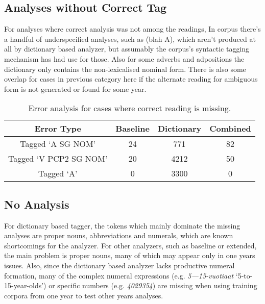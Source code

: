 \documentclass[postprint]{flammie}
\begin{document}
\subsection{Analyses without Correct Tag}

For analyses where correct analysis was not among the readings, 
In corpus there’s a handful of underspecified analyses, such as (blah A),
which aren’t produced at all by dictionary based analyzer, but assumably the
corpus’s syntactic tagging mechanism has had use for those. Also for some
adverbs and adpositions the dictionary only contains the non-lexicalised
nominal form. There is also some overlap for cases in previous category here
if the alternate reading for ambiguous form is not generated or found for some
year.

\begin{table}[h!]
  \centering
  \caption{Error analysis for cases where correct reading is missing.
  }\label{tab:incorrect1}
  \begin{scriptsize}
    \begin{tabular}{c|c|c|c}
      \hline
      Error Type & Baseline & Dictionary & Combined \\
	  \hline
	  Tagged `A SG NOM' & 24 & 771 & 82 \\
	  Tagged `V PCP2 SG NOM' & 20 & 4212 & 50 \\
	  Tagged `A' & 0 & 3300 & 0 \\
	  \hline 
    \end{tabular}
  \end{scriptsize}
\end{table}

\subsection{No Analysis}

For dictionary based tagger, the tokens which mainly dominate the missing
analyses are proper nouns, abbreviations and numerals, which are known
shortcomings for the analyzer. For other analyzers, such as baseline or
extended, the main problem is proper nouns, many of which may appear only in
one years issues. Also, since the dictionary based analyzer lacks productive
numeral formation, many of the complex numeral expressions (e.g.
\emph{5---15-vuotiaat} `5-to-15-year-olds')  or specific numbers (e.g. 
\emph{4029354})
are missing when using training corpora from one year to test other years
analyses.
\end{document}

